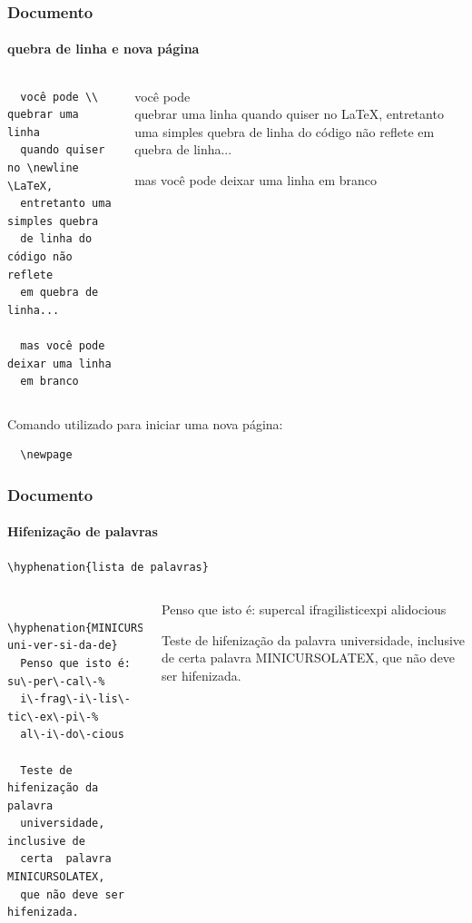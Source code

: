 \begin{frame}[fragile]
\frametitle{Documento}
\framesubtitle{quebra de linha e nova página}

  \begin{scriptsize}
  \begin{columns}[c]
  \begin{verbatim}
  você pode \\ quebrar uma linha 
  quando quiser no \newline \LaTeX, 
  entretanto uma simples quebra
  de linha do código não reflete 
  em quebra de linha... 
  
  mas você pode deixar uma linha 
  em branco
  \end{verbatim} 
  \begin{fmpage}{\textwidth}
  você pode \\ quebrar uma linha 
  quando quiser no \newline \LaTeX, 
  entretanto uma simples quebra
  de linha do código não reflete 
  em quebra de linha... 
  
  mas você pode deixar uma linha 
  em branco
  \end{fmpage}
  \end{columns}
  \end{scriptsize}
  
  Comando utilizado para iniciar uma nova página:
 
  \begin{verbatim}
  \newpage
  \end{verbatim} 

\end{frame}


\begin{frame}[fragile]
\frametitle{Documento}
\framesubtitle{Hifenização de palavras}
  \begin{verbatim}
\hyphenation{lista de palavras}
  \end{verbatim}

  \scriptsize
  \begin{columns}[c]
  \begin{verbatim}
  \hyphenation{MINICURSOLATEX uni-ver-si-da-de}
  Penso que isto é: su\-per\-cal\-%
  i\-frag\-i\-lis\-tic\-ex\-pi\-%
  al\-i\-do\-cious
  
  Teste de hifenização da palavra 
  universidade, inclusive de  
  certa  palavra MINICURSOLATEX, 
  que não deve ser hifenizada.
  \end{verbatim} 
  \begin{fmpage}{\textwidth}
  Penso que isto é: su\-per\-cal\-%
  i\-frag\-i\-lis\-tic\-ex\-pi\-%
  al\-i\-do\-cious
  
  Teste de hifenização da palavra 
  universidade, inclusive de  
  certa  palavra MINICURSOLATEX, 
  que não deve ser hifenizada.
  \end{fmpage}
  \end{columns}
\end{frame}



